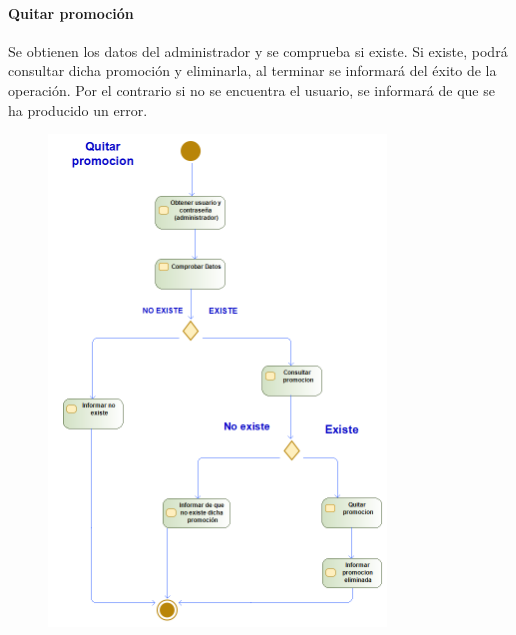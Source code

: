 \paragraph{Quitar promoción}
Se obtienen los datos del administrador y se comprueba si existe. Si existe, podrá consultar dicha promoción y eliminarla, al terminar se informará del éxito de la operación. Por el contrario si no se encuentra el usuario, se informará de que se ha producido un error.
\begin{figure}[H]
    \centering
    \includegraphics[width=0.8\textwidth]{Use_Cases/quitar_promocion.png}
\end{figure}
